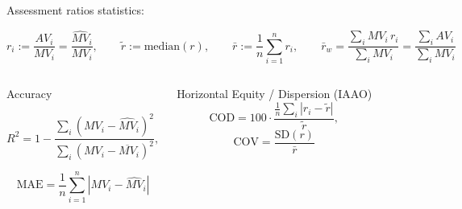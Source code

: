 \documentclass[aspectratio=169,10pt]{beamer}
\begin{document}


\begin{frame}{\frameC}
\subsection{\frameC}
Assessment ratios statistics:
\footnotesize
\setlength{\abovedisplayskip}{3pt}
\setlength{\belowdisplayskip}{3pt}
\setlength{\abovedisplayshortskip}{2pt}
\setlength{\belowdisplayshortskip}{2pt}


\[ 
r_i := \frac{{AV}_i}{MV_i} = \frac{{\widehat{MV}}_i}{MV_i},\qquad
\tilde r := \mathrm{median}(r),\qquad
\bar r := \frac{1}{n}\sum_{i=1}^n r_i, \qquad \bar r_w=\frac{\sum_i MV_i\,r_i}{\sum_i MV_i}=\frac{\sum_i AV_i}{\sum_i MV_i}
\]

\begin{columns}[T,onlytextwidth]

  \begin{block}{Accuracy}

  
    \[
    R^2=1- \frac{\sum_{i} (MV_i - \widehat{MV}_i)^2}{\sum_{i} (MV_i - \overline{MV}_i)^2} ,
    \]
    
     \[
    \mathrm{MAE}=\frac{1}{n}\sum_{i=1}^n\left|MV_i - \widehat{MV}_i\right|
    \]
  \end{block}

  \begin{block}{Horizontal Equity / Dispersion (IAAO)}
    \[
    \mathrm{COD}=100\cdot
    \frac{\frac{1}{n}\sum_i |r_i-\tilde r|}{\tilde r},
    \]
    \[
    \mathrm{COV}=\frac{\mathrm{SD}(r)}{\bar r}
    \]
  \end{block}




\end{columns}
\end{frame}
\end{document}

